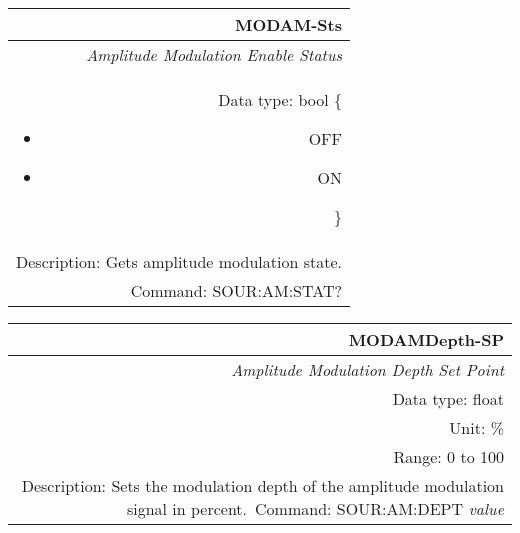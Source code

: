 \documentclass[openany]{article}
\begin{document}
		\begin{tabular}{N}
			\hline
			\bfseries MODAM-Sts \\ \hline
			\emph{Amplitude Modulation Enable Status} \\
			Data type: bool \{\begin{itemize}[noitemsep]
				\small
				\item[] OFF
				\item[] ON
			\end{itemize}\} \\
			Description: Gets amplitude modulation state. \\
			Command: SOUR:AM:STAT? \\
			
		\end{tabular}
%
		\begin{tabular}{N}
			\hline
			\bfseries MODAMDepth-SP \\ \hline
			\emph{Amplitude Modulation Depth Set Point} \\
			Data type: float \\
			Unit: \% \\
			Range: 0 to 100 \\
			Description: Sets the modulation depth of the amplitude modulation signal in percent.\
			Command: SOUR:AM:DEPT \emph{value} \\
			
		\end{tabular}
\end{document}
